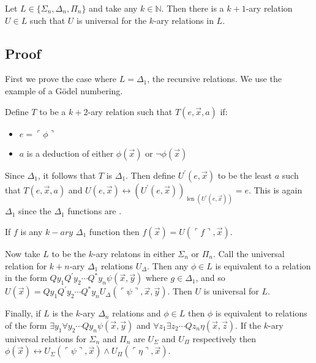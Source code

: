 \documentclass[12pt]{article}
\begin{document}
Let $L\in\{\Sigma_n,\Delta_n,\Pi_n\}$ and take any $k\in\mathbb{N}$.  Then there is a $k+1$-ary relation $U\in L$ such that $U$ is universal for the $k$-ary relations in $L$.

\subsection*{Proof}

First we prove the case where $L=\Delta_1$, the recursive relations.  We use the example of a G\"odel numbering.

Define $T$ to be a $k+2$-ary relation such that $T(e,\vec{x},a)$ if:

\begin{itemize}
\item $e=\ulcorner\phi\urcorner$ 

\item $a$ is a deduction of either $\phi(\vec{x})$ or $\neg\phi(\vec{x})$
\end{itemize}

Since $\Delta_1$, it follows that $T$ is $\Delta_1$.  Then define $U^\prime(e,\vec{x})$ to be the least $a$ such that $T(e,\vec{x},a)$ and $U(e,\vec{x})\leftrightarrow (U^\prime(e,\vec{x}))_{\operatorname{len}(U^\prime(e,\vec{x}))}=e$.  This is again $\Delta_1$ since the $\Delta_1$ functions are .

If $f$ is any $k-ary$ $\Delta_1$ function then $f(\vec{x})=U(\ulcorner f\urcorner,\vec{x})$.

Now take $L$ to be the $k$-ary relatons in either $\Sigma_n$ or $\Pi_n$.  Call the universal relation for $k+n$-ary $\Delta_1$ relations $U_\Delta$.  Then any $\phi\in L$ is equivalent to a relation in the form $Q y_1 Q^\prime y_2 \cdots Q^* y_n \psi(\vec{x},\vec{y})$ where $g\in\Delta_1$, and so $U(\vec{x})=Q y_1 Q^\prime y_2 \cdots Q^* y_n U_\Delta(\ulcorner\psi\urcorner,\vec{x},\vec{y})$.  Then $U$ is universal for $L$.

Finally, if $L$ is the $k$-ary $\Delta_n$ relations and $\phi\in L$ then $\phi$ is equivalent to relations of the form $\exists y_1\forall y_2\cdots Q y_n \psi(\vec{x},\vec{y})$ and $\forall z_1\exists z_2\cdots Q z_n\eta(\vec{x},\vec{z})$.  If the $k$-ary universal relations for $\Sigma_n$ and $\Pi_n$ are $U_\Sigma$ and $U_\Pi$ respectively then $\phi(\vec{x})\leftrightarrow U_\Sigma(\ulcorner\psi\urcorner,\vec{x})\wedge U_\Pi(\ulcorner\eta\urcorner,\vec{x})$.
\end{document}

